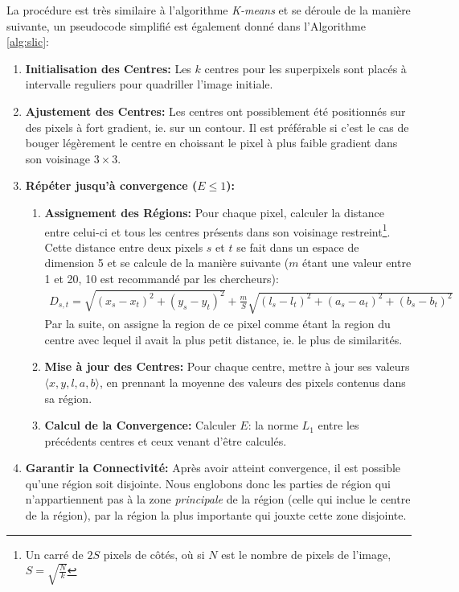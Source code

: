 \documentclass[12pt]{article}
\begin{document}
La proc\'edure est tr\`es similaire \`a l'algorithme \textit{K-means} et se d\'eroule de la mani\`ere suivante, un pseudocode simplifi\'e est \'egalement donn\'e dans l'Algorithme \ref{alg:slic}:

\begin{enumerate}
  \item \textbf{Initialisation des Centres:} Les $k$ centres pour les superpixels sont plac\'es \`a intervalle reguliers pour quadriller l'image initiale.
  \item \textbf{Ajustement des Centres:} Les centres ont possiblement \'et\'e positionn\'es sur des pixels \`a fort gradient, ie. sur un contour.
        Il est pr\'ef\'erable si c'est le cas de bouger l\'eg\`erement le centre en choissant le pixel \`a plus faible gradient dans son voisinage $3\times 3$.
  \item \textbf{R\'ep\'eter jusqu'\`a convergence ($E \leq 1$):}
        \begin{enumerate}
          \item \textbf{Assignement des R\'egions:} Pour chaque pixel, calculer la distance entre celui-ci et tous les centres pr\'esents dans son voisinage restreint\footnote{Un carr\'e de $2S$ pixels de c\^ot\'es, o\`u si $N$ est le nombre de pixels de l'image, $S=\sqrt{\frac{N}{k}}$}.
                Cette distance entre deux pixels $s$ et $t$ se fait dans un espace de dimension 5 et se calcule de la mani\`ere suivante ($m$ \'etant une valeur entre 1 et 20, 10 est recommand\'e par les chercheurs):
                \begin{align*}
                  D_{s,t} = \sqrt{(x_s - x_t)^2 + (y_s - y_t)^2}  + \frac{m}{S} \sqrt{(l_s - l_t)^2 + (a_s - a_t)^2 +  (b_s - b_t)^2}
                \end{align*}
                Par la suite, on assigne la region de ce pixel comme \'etant la region du centre avec lequel il avait la plus petit distance,
                ie. le plus de similarit\'es.
          \item \textbf{Mise \`a jour des Centres:} Pour chaque centre, mettre \`a jour ses valeurs $\langle x, y, l, a, b\rangle$,
                en prennant la moyenne des valeurs des pixels contenus dans sa r\'egion.
          \item \textbf{Calcul de la Convergence:} Calculer $E$: la norme $L_1$ entre les pr\'ec\'edents centres et ceux venant d'\^etre calcul\'es.
        \end{enumerate}
  \item \textbf{Garantir la Connectivit\'e:} Apr\`es avoir atteint convergence, il est possible qu'une r\'egion soit disjointe.
        Nous englobons donc les parties de r\'egion qui n'appartiennent pas \`a la zone \textit{principale} de la r\'egion (celle qui inclue le centre de la r\'egion),
        par la r\'egion la plus importante qui jouxte cette zone disjointe.
\end{enumerate}
\end{document}
